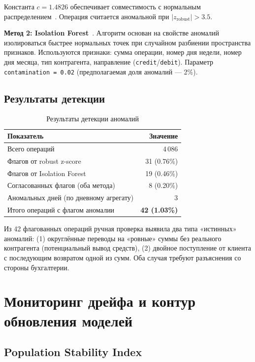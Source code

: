 Константа $c = 1.4826$ обеспечивает совместимость с нормальным распределением~\cite{rousseeuw1993alternatives}. Операция считается аномальной при $|z_\text{robust}| > 3.5$.

\textbf{Метод 2: Isolation Forest}~\cite{liu2008isolation}. Алгоритм основан на свойстве аномалий изолироваться быстрее нормальных точек при случайном разбиении пространства признаков. Используются признаки: сумма операции, номер дня недели, номер дня месяца, тип контрагента, направление (\texttt{credit}/\texttt{debit}). Параметр \texttt{contamination~=~0.02} (предполагаемая доля аномалий --- 2\%).

\subsection{Результаты детекции}

\begin{table}[H]
\centering
\caption{Результаты детекции аномалий}
\label{tab:anomaly_results}
\begin{tabular}{lr}
\toprule
\textbf{Показатель} & \textbf{Значение} \\
\midrule
Всего операций & 4\,086 \\
Флагов от robust z-score & 31 (0.76\%) \\
Флагов от Isolation Forest & 19 (0.46\%) \\
Согласованных флагов (оба метода) & 8 (0.20\%) \\
Аномальных дней (по дневному агрегату) & 3 \\
Итого операций с флагом аномалии & \textbf{42 (1.03\%)} \\
\bottomrule
\end{tabular}
\end{table}

Из 42 флагованных операций ручная проверка выявила два типа «истинных» аномалий: (1) округлённые переводы на «ровные» суммы без реального контрагента (потенциальный вывод средств), (2) двойное поступление от клиента с последующим возвратом одной из сумм. Оба случая требуют разъяснения со стороны бухгалтерии.

\section{Мониторинг дрейфа и контур обновления моделей}

\subsection{Population Stability Index}

